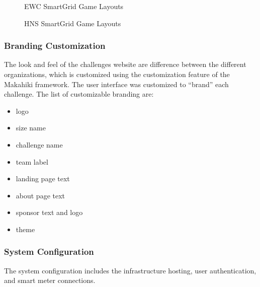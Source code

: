 \begin{figure}[htbp]
	\centering
		\caption{EWC SmartGrid Game Layouts}
		\label{fig:EWC-SGG}
\end{figure}

\begin{figure}[htbp]
	\centering
		\caption{HNS SmartGrid Game Layouts}
		\label{fig:GS-SGG}
\end{figure}

\subsubsection{Branding Customization}
The look and feel of the challenges website are difference between the different organizations, which is customized using the customization feature of the Makahiki framework. The user interface was customized to ``brand'' each challenge. The list of customizable branding are:

\begin{itemize}
\item logo
\item size name
\item challenge name
\item team label
\item landing page text
\item about page text
\item sponsor text and logo
\item theme
\end{itemize}

\subsubsection{System Configuration}

The system configuration includes the infrastructure hosting, user authentication, and smart meter connections. 

